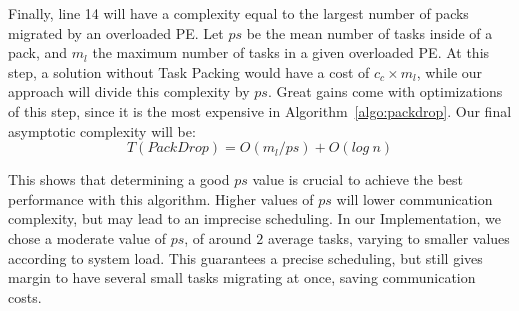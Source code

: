 Finally, line 14 will have a complexity equal to the largest number of packs migrated by an overloaded PE.
Let $ps$ be the mean number of tasks inside of a pack, and $m_l$ the maximum number of tasks in a given overloaded PE.
At this step, a solution without Task Packing would have a cost of $c_c\times m_l$, while our approach will divide this complexity by $ps$. 
Great gains come with optimizations of this step, since it is the most expensive in Algorithm~\ref{algo:packdrop}.
Our final asymptotic complexity will be:
\begin{equation}
 T(PackDrop) = O(m_l/ps) + O(log\ n)
 \label{eq:worstcase}
\end{equation}

This shows that determining a good $ps$ value is crucial to achieve the best performance with this algorithm.
Higher values of $ps$ will lower communication complexity, but may lead to an imprecise scheduling.
In our Implementation, we chose a moderate value of $ps$, of around $2$ average tasks, varying to smaller values according to system load.
This guarantees a precise scheduling, but still gives margin to have several small tasks migrating at once, saving communication costs.
